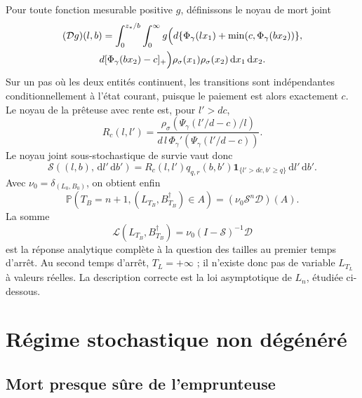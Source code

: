 \documentclass[11pt,a4paper]{article}
\newcommand{\Pp}{\mathbb P}
\newcommand{\1}{\mathbf 1}
\newcommand{\dd}{\,\mathrm d}
\newcommand{\Law}{\mathcal L}
\newcommand{\cim}{\dagger}
\theoremstyle{definition}
\theoremstyle{remark}
\begin{document}
Pour toute fonction mesurable positive $g$, définissons le noyau de mort
joint
\begin{multline}
(\mathcal Dg)(l,b)=
\int_0^{z_*/b}\int_0^\infty
g\Bigl(
d\{\Phi_\gamma(lx_1)+\min(c,\Phi_\gamma(bx_2))\},\\
d[\Phi_\gamma(bx_2)-c]_+
\Bigr)
\rho_\sigma(x_1)\rho_\sigma(x_2)\dd x_1\dd x_2.
\label{eq:joint-death-kernel}
\end{multline}
Sur un pas où les deux entités continuent, les transitions sont
indépendantes conditionnellement à l'état courant, puisque le paiement est
alors exactement $c$. Le noyau de la prêteuse avec rente est, pour
$l'>dc$,
\begin{equation}
R_c(l,l')=
\frac{\rho_\sigma\!\left(
\Psi_\gamma(l'/d-c)/l\right)}
{d\,l\,\Phi_\gamma'\!\left(\Psi_\gamma(l'/d-c)\right)}.
\label{eq:lender-rent-kernel}
\end{equation}
Le noyau joint sous-stochastique de survie vaut donc
\begin{equation}
\mathcal S((l,b),\dd l'\dd b')
=R_c(l,l')q_{q,r}(b,b')
\1_{\{l'>dc,b'\geq q\}}\dd l'\dd b'.
\label{eq:joint-survival-kernel}
\end{equation}
Avec $\nu_0=\delta_{(L_0,B_0)}$, on obtient enfin
\begin{equation}
\boxed{\quad
\Pp(T_B=n+1,(L_{T_B},B_{T_B}^{\cim})\in A)
=(\nu_0\mathcal S^n\mathcal D)(A).
\quad}
\label{eq:joint-stopped-law}
\end{equation}
La somme
\begin{equation}
\Law(L_{T_B},B_{T_B}^{\cim})
=\nu_0(I-\mathcal S)^{-1}\mathcal D
\label{eq:joint-resolvent}
\end{equation}
est la réponse analytique complète à la question des tailles au premier
temps d'arrêt. Au second temps d'arrêt, $T_L=+\infty$ ; il n'existe donc
pas de variable $L_{T_L}$ à valeurs réelles. La description correcte est
la loi asymptotique de $L_n$, étudiée ci-dessous.

\section{Régime stochastique non dégénéré}
\label{sec:asymptotic-stochastic}

\subsection{Mort presque sûre de l'emprunteuse}
\end{document}
